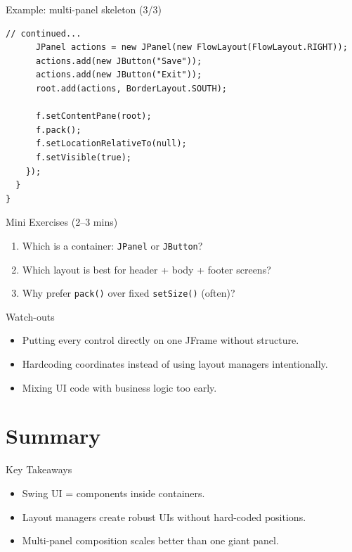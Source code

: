 \documentclass{beamer}
\begin{document}
\begin{frame}[fragile,shrink=8]{Example: multi-panel skeleton (3/3)}
\begin{lstlisting}
// continued...
      JPanel actions = new JPanel(new FlowLayout(FlowLayout.RIGHT));
      actions.add(new JButton("Save"));
      actions.add(new JButton("Exit"));
      root.add(actions, BorderLayout.SOUTH);

      f.setContentPane(root);
      f.pack();
      f.setLocationRelativeTo(null);
      f.setVisible(true);
    });
  }
}
\end{lstlisting}
  \slidesources{\OOPSUnitIVSources}
\end{frame}

\begin{frame}{Mini Exercises (2--3 mins)}
  \begin{enumerate}[<+->]
    \item Which is a container: \texttt{JPanel} or \texttt{JButton}?
    \item Which layout is best for header + body + footer screens?
    \item Why prefer \texttt{pack()} over fixed \texttt{setSize()} (often)?
  \end{enumerate}
  \slidesources{\OOPSUnitIVSources}
\end{frame}

\begin{frame}{Watch-outs}
\begin{itemize}[<+->]
  \item Putting every control directly on one JFrame without structure.
  \item Hardcoding coordinates instead of using layout managers intentionally.
  \item Mixing UI code with business logic too early.
\end{itemize}
  \slidesources{\OOPSUnitIVSources}
\end{frame}

\section{Summary}
\label{sec:summary}

\begin{frame}{Key Takeaways}
  \begin{itemize}[<+->]
    \item Swing UI = components inside containers.
    \item Layout managers create robust UIs without hard-coded positions.
    \item Multi-panel composition scales better than one giant panel.
  \end{itemize}
  \slidesources{\OOPSUnitIVSources}
\end{frame}
\end{document}
